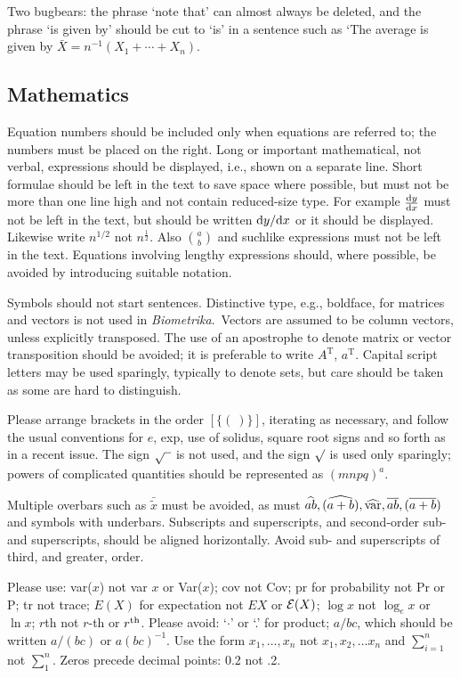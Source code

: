 \documentclass[lineno]{biometrika}
\def\Bka{{\it Biometrika}}
\def\T{{ \mathrm{\scriptscriptstyle T} }}
\begin{document}
Two bugbears: the phrase `note that' can almost always be deleted, and the phrase `is given by' should be cut to `is' in a sentence such as `The average is given by $\bar X=n^{-1}(X_1+\cdots+X_n)$.

\subsection{Mathematics}

 Equation numbers should be included only when equations are referred to; the
numbers must be placed on the right. Long or important mathematical, not verbal,
expressions should be displayed, i.e., shown on a separate line. Short formulae should be
left in the text to save space where possible, but must not be more than one line high and
not contain reduced-size type. For example $\frac{{\rm d}y}{{\rm d}x}$ must not be left in the text, but should be
written ${{\rm d}y}/{{\rm d}x}$ or it should be displayed. Likewise write $n^{1/2}$ not $n^{\frac12}$.   Also $\displaystyle{a\choose{b}}$ and suchlike expressions
 must not be left in the text. Equations
involving lengthy expressions should, where possible, be avoided by introducing suitable
notation.

Symbols should not start sentences. Distinctive type, e.g., boldface, for matrices and
vectors is not used in \Bka.\ Vectors are assumed to be column vectors, unless
explicitly transposed. The use of an apostrophe to denote matrix or vector transposition should be avoided; it is preferable to write $A^\T$, $a^\T$.   Capital script letters may be used sparingly, typically to denote sets,
but care should be taken as some are hard to distinguish.

Please arrange brackets in the order $[\{(\ )\}]$, iterating as necessary,
 and follow the usual conventions for $e$, exp, use of solidus, square root signs and so forth
as in a recent issue. The sign $\sqrt{\hphantom{a}}$ is not used, and  the sign $\surd$ is used
only sparingly; powers of complicated quantities should be represented as $(mnpq)^{a}$.

Multiple overbars such as $\bar{\tilde{x}}$ must be avoided, as must $\widehat{ab}, (\widehat{a+b}), \widehat{\rm var}, \overline{ab},(\overline{a+b})$
and symbols with underbars. Subscripts and superscripts, and second-order sub- and
superscripts, should be aligned horizontally. Avoid sub- and superscripts of third, and greater, order.

Please use: var($x$) not var $x$ or Var($x$); cov not Cov; pr for probability not Pr or P;
tr not trace; $E(X)$ for expectation not $EX$ or ${\cal E}(X)$; $\log x$ not $\log_e x$ or $\ln x$; $r$th not $r$-th or $r^{\rm th}$.
Please avoid: `$\cdot$' or `.' for product; $a/bc$, which should be written $a/(bc)$ or $a(bc)^{-1}$. Use the form $x_1,\ldots , x_n$ not $x_1, x_2,\ldots x_n$ and $\sum^{n}_{i=1}$ not $\sum^n_1$. Zeros precede decimal points: 0.2 not .2.
\end{document}
